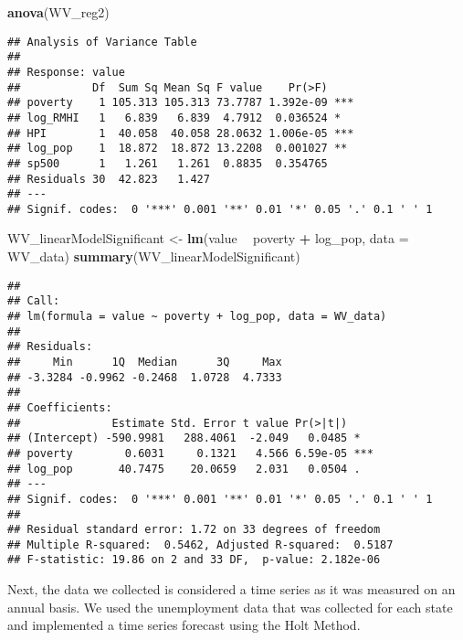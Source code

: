 \documentclass[
]{article}
\newenvironment{Shaded}{\begin{snugshade}}{\end{snugshade}}
\newcommand{\DataTypeTok}[1]{\textcolor[rgb]{0.13,0.29,0.53}{#1}}
\newcommand{\KeywordTok}[1]{\textcolor[rgb]{0.13,0.29,0.53}{\textbf{#1}}}
\newcommand{\NormalTok}[1]{#1}
\newcommand{\OperatorTok}[1]{\textcolor[rgb]{0.81,0.36,0.00}{\textbf{#1}}}
\newcommand{\StringTok}[1]{\textcolor[rgb]{0.31,0.60,0.02}{#1}}
\begin{document}
\begin{Shaded}
\begin{Highlighting}[]
\KeywordTok{anova}\NormalTok{(WV_reg2)}
\end{Highlighting}
\end{Shaded}

\begin{verbatim}
## Analysis of Variance Table
## 
## Response: value
##           Df  Sum Sq Mean Sq F value    Pr(>F)    
## poverty    1 105.313 105.313 73.7787 1.392e-09 ***
## log_RMHI   1   6.839   6.839  4.7912  0.036524 *  
## HPI        1  40.058  40.058 28.0632 1.006e-05 ***
## log_pop    1  18.872  18.872 13.2208  0.001027 ** 
## sp500      1   1.261   1.261  0.8835  0.354765    
## Residuals 30  42.823   1.427                      
## ---
## Signif. codes:  0 '***' 0.001 '**' 0.01 '*' 0.05 '.' 0.1 ' ' 1
\end{verbatim}

\begin{Shaded}
\begin{Highlighting}[]
\NormalTok{WV_linearModelSignificant <-}\StringTok{ }\KeywordTok{lm}\NormalTok{(value }\OperatorTok{~}\StringTok{ }\NormalTok{poverty }\OperatorTok{+}\StringTok{ }\NormalTok{log_pop, }\DataTypeTok{data =}\NormalTok{ WV_data)}
\KeywordTok{summary}\NormalTok{(WV_linearModelSignificant)}
\end{Highlighting}
\end{Shaded}

\begin{verbatim}
## 
## Call:
## lm(formula = value ~ poverty + log_pop, data = WV_data)
## 
## Residuals:
##     Min      1Q  Median      3Q     Max 
## -3.3284 -0.9962 -0.2468  1.0728  4.7333 
## 
## Coefficients:
##              Estimate Std. Error t value Pr(>|t|)    
## (Intercept) -590.9981   288.4061  -2.049   0.0485 *  
## poverty        0.6031     0.1321   4.566 6.59e-05 ***
## log_pop       40.7475    20.0659   2.031   0.0504 .  
## ---
## Signif. codes:  0 '***' 0.001 '**' 0.01 '*' 0.05 '.' 0.1 ' ' 1
## 
## Residual standard error: 1.72 on 33 degrees of freedom
## Multiple R-squared:  0.5462, Adjusted R-squared:  0.5187 
## F-statistic: 19.86 on 2 and 33 DF,  p-value: 2.182e-06
\end{verbatim}

Next, the data we collected is considered a time series as it was
measured on an annual basis. We used the unemployment data that was
collected for each state and implemented a time series forecast using
the Holt Method.
\end{document}
